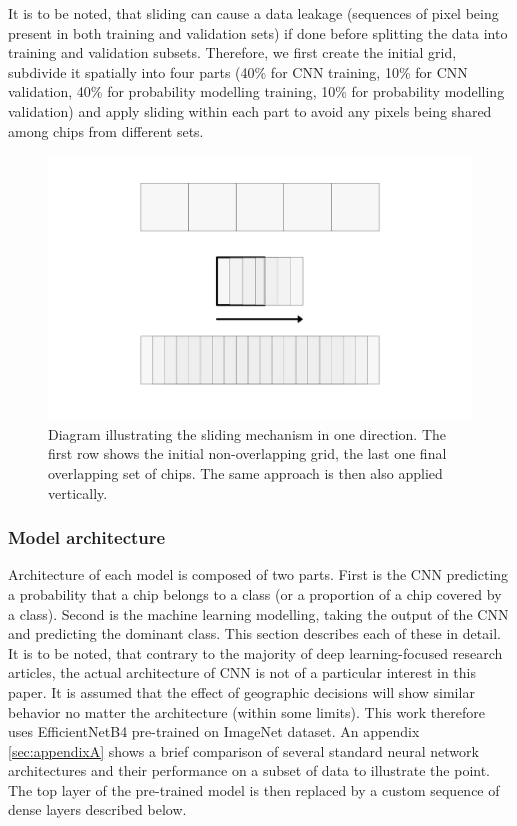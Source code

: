 It is to be noted, that sliding can cause a data leakage (sequences of pixel being
present in both training and validation sets) if done before splitting the data into
training and validation subsets. Therefore, we first create the initial grid, subdivide
it spatially into four parts (40\% for CNN training, 10\% for CNN validation, 40\% for
probability modelling training, 10\% for probability modelling validation) and apply
sliding within each part to avoid any pixels being shared among chips from different
sets.

\begin{figure}
    \centering
    \includegraphics[width=.8\linewidth]{fig/sliding.png}
    \caption{Diagram illustrating the sliding mechanism in one direction. The first row shows the initial non-overlapping grid, the last one final overlapping set of chips. The same approach is then also applied vertically.}
    \label{fig:sliding}
\end{figure}


\subsubsection{Model architecture}



Architecture of each model is composed of two parts. First is the CNN predicting a
probability that a chip belongs to a class (or a proportion of a chip covered by a
class). Second is the machine learning modelling, taking the output of the CNN and
predicting the dominant class. This section describes each of these in detail. It is to
be noted, that contrary to the majority of deep learning-focused research articles, the
actual architecture of CNN is not of a particular interest in this paper. It is assumed
that the effect of geographic decisions will show similar behavior no matter the
architecture (within some limits). This work therefore uses EfficientNetB4 pre-trained
on ImageNet dataset. An appendix \ref*{sec:appendixA} shows a brief comparison of
several standard neural network architectures and their performance on a subset of data
to illustrate the point. The top layer of the pre-trained model is then replaced by a
custom sequence of dense layers described below.

